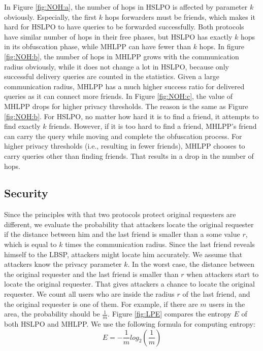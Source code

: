 In Figure \ref{fig:NOH:a}, the number of hops in HSLPO is affected by parameter $k$ obviously. Especially, the first $k$ hops forwarders must be friends, which makes it hard for HSLPO to have queries to be forwarded successfully. Both protocols have similar number of hops in their free phases, but HSLPO has exactly $k$ hops in its obfuscation phase, while MHLPP can have fewer than $k$ hops. In figure \ref{fig:NOH:b}, the number of hops in MHLPP grows with the communication radius obviously, while it does not change a lot in HSLPO, because only successful delivery queries are counted in the statistics. Given a large communication radius, MHLPP has a much higher success ratio for delivered queries as it can connect more friends. In Figure \ref{fig:NOH:c}, the value of MHLPP drops for higher privacy thresholds. The reason is the same as Figure \ref{fig:NOH:b}. For HSLPO, no matter how hard it is to find a friend, it attempts to find exactly $k$ friends. However, if it is too hard to find a friend, MHLPP's friend can carry the query while moving and complete the obfuscation process. For higher privacy thresholds (i.e., resulting in fewer friends), MHLPP chooses to carry queries other than finding friends. That results in a drop in the number of hops.


\subsection{ Security}

\noindent Since the principles with that two protocols protect original requesters are different, we evaluate the probability that attackers locate the original requester if the distance between him and the last friend is smaller than a some value $r$, which is equal to $k$ times the communication radius. Since the last friend reveals himself to the LBSP, attackers might locate him accurately. We assume that attackers know the privacy parameter $k$. In the worst case, the distance between the original requester and the last friend is smaller than $r$ when attackers start to locate the original requester. That gives attackers a chance to locate the original requester. We count all users who are inside the radius $r$ of the last friend, and the original requester is one of them. For example, if there are $m$ users in the area, the probability should be $\frac{1}{m}$. Figure \ref{fig:LPE} compares the entropy $E$ of both HSLPO and MHLPP. We use the following formula for computing entropy:
\begin{equation} \label{GrindEQ__Entropy_} 
E=-\frac{1}{m}{log}_2\left(\frac{1}{m}\right)
\end{equation}

